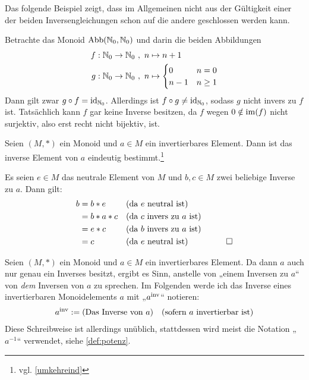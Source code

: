 \begin{bsp}[*]
    Das folgende Beispiel zeigt, dass im Allgemeinen nicht aus der Gültigkeit einer der beiden Inversengleichungen schon auf die andere geschlossen werden kann.
    
    Betrachte das Monoid $\operatorname{Abb}(\mathbb N_0,\mathbb N_0)$ und darin die beiden Abbildungen
    \begin{align*}
        f : \mathbb N_0 \to \mathbb N_0 \ &,\ n \mapsto n+1 \\
        g: \mathbb N_0 \to \mathbb N_0 \ &,\ n\mapsto \begin{cases}
            0 & n=0 \\
            n-1 & n\ge 1
        \end{cases}
    \end{align*}
    Dann gilt zwar $g\circ f=\mathrm{id}_{\mathbb N_0}$. Allerdings ist $f\circ g\neq \mathrm{id}_{\mathbb N_0}$, sodass $g$ nicht invers zu $f$ ist. Tatsächlich kann $f$ gar keine Inverse besitzen, da $f$ wegen $0\notin \operatorname{im}(f)$ nicht surjektiv, also erst recht nicht bijektiv, ist.
\end{bsp}


\begin{satz} \label{inveind}
    Seien $(M,*)$ ein Monoid und $a\in M$ ein invertierbares Element. Dann ist das inverse Element von $a$ eindeutig bestimmt.\footnote{vgl. \cref{umkehreind}}
\end{satz}
 
 
\begin{bew}
    Es seien $e\in M$ das neutrale Element von $M$ und $b,c\in M$ zwei beliebige Inverse zu $a$. Dann gilt:
    \begin{align*}
        b & = b*e && (\text{da $e$ neutral ist}) \\
        & = b* a*c && (\text{da $c$ invers zu $a$ ist}) \\
        & = e*c && (\text{da $b$ invers zu $a$ ist}) \\
        & = c && (\text{da $e$ neutral ist}) &\qed
    \end{align*}
\end{bew}


\begin{nota}
    Seien $(M,*)$ ein Monoid und $a\in M$ ein invertierbares Element. Da dann $a$ auch nur genau ein Inverses besitzt, ergibt es Sinn, anstelle von „einem Inversen zu $a$“ von \emph{dem} Inversen von $a$ zu sprechen. Im Folgenden werde ich das Inverse eines invertierbaren Monoidelements $a$ mit „$a^{\mathrm{inv}}$“ notieren:
    \begin{align*}
         a^{\mathrm{inv}} := (\text{Das Inverse von $a$}) && (\text{sofern $a$ invertierbar ist})
    \end{align*}
    Diese Schreibweise ist allerdings unüblich, stattdessen wird meist die Notation „$a^{-1}$“ verwendet, siehe \cref{def:potenz}.
\end{nota}



